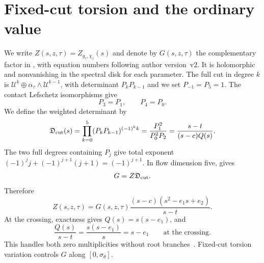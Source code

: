 \documentclass[11pt,letterpaper,reqno]{amsart}
\theoremstyle{remark}
\newcommand{\cU}{\mathcal U}
\begin{document}
\section{Fixed-cut torsion and the ordinary value}\label{sec:normalization}
We write $Z(s,z,\tau)=Z_{g_\tau,\chi_z}(s)$ and denote by
$G(s,z,\tau)$ the complementary factor in
\cite[(6.4)--(6.5)]{CD}, with equation numbers following author
version~v2. It is holomorphic and nonvanishing in the spectral disk
for each parameter. The full cut in degree $k$ is
$\cU^k\oplus\alpha_\tau\wedge\cU^{k-1}$, with determinant $P_kP_{k-1}$
and we set $P_{-1}=P_5=1$. The contact Lefschetz isomorphisms give
\[
 P_3=P_1,\qquad P_4=P_0.
\]
We define the weighted determinant by
\begin{equation}\label{fulltelescoping}
 \mathfrak D_{\rm cut}(s)
 =\prod_{k=0}^{5}(P_kP_{k-1})^{(-1)^k k}
 =\frac{P_1^2}{P_0^2P_2}
 =\frac{s-t}{(s-c)Q(s)}.
\end{equation}
The two full degrees containing $P_j$ give total exponent
$(-1)^j j+(-1)^{j+1}(j+1)=(-1)^{j+1}$.
In flow dimension five, \cite[(6.5)]{CD} gives
\[
 G=Z\mathfrak D_{\rm cut}.
\]
Therefore
\begin{equation}\label{divisor}
 Z(s,z,\tau)=G(s,z,\tau)
       \frac{(s-c)(s^2-e_1s+e_2)}{s-t}.
\end{equation}
At the crossing, exactness gives $Q(s)=s(s-e_1)$, and
\[
 \frac{Q(s)}{s-t}=\frac{s(s-e_1)}{s}=s-e_1
 \qquad\text{at the crossing}.
\]
This handles both zero multiplicities without root branches~\cite{Lawton}.
Fixed-cut torsion variation controls $G$ along $[0,\sigma_\theta]$.
\end{document}
